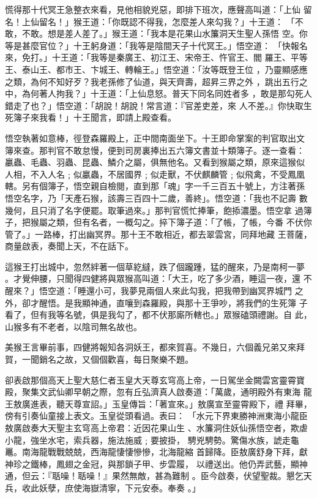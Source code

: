 \begin{pinyinscope}
{慌得那十代冥王急整衣來看，見他相貌兇惡，即排下班次，應聲高叫道：「上仙
留名！上仙留名！」猴王道：「你既認不得我，怎麼差人來勾我？」十王道：
「不敢，不敢。想是差人差了。」猴王道：「我本是花果山水簾洞天生聖人孫悟
空。你等是甚麼官位？」十王躬身道：「我等是陰間天子十代冥王。」悟空道：
「快報名來，免打。」十王道：「我等是秦廣王、初江王、宋帝王、忤官王、閻
羅王、平等王、泰山王、都市王、卞城王、轉輪王。」悟空道：「汝等既登王位
，乃靈顯感應之類，為何不知好歹？我老孫修了仙道，與天齊壽，超昇三界之外
，跳出五行之中，為何著人拘我？」十王道：「上仙息怒。普天下同名同姓者多
，敢是那勾死人錯走了也？」悟空道：「胡說！胡說！常言道：『官差吏差，來
人不差。』你快取生死簿子來我看！」十王聞言，即請上殿查看。

悟空執著如意棒，徑登森羅殿上，正中間南面坐下。十王即命掌案的判官取出文
簿來查。那判官不敢怠慢，便到司房裏捧出五六簿文書並十類簿子。逐一查看：
臝蟲、毛蟲、羽蟲、昆蟲、鱗介之屬，俱無他名。又看到猴屬之類，原來這猴似
人相，不入人名﹔似臝蟲，不居國界﹔似走獸，不伏麒麟管﹔似飛禽，不受鳳凰
轄。另有個簿子，悟空親自檢閱，直到那「魂」字一千三百五十號上，方注著孫
悟空名字，乃「天產石猴，該壽三百四十二歲，善終」。悟空道：「我也不記壽
數幾何，且只消了名字便罷。取筆過來。」那判官慌忙捧筆，飽掭濃墨。悟空拿
過簿子，把猴屬之類，但有名者，一概勾之。捽下簿子道：「了帳，了帳，今番
不伏你管了。」一路棒，打出幽冥界。那十王不敢相近，都去翠雲宮，同拜地藏
王菩薩，商量啟表，奏聞上天，不在話下。

這猴王打出城中，忽然絆著一個草紇繨，跌了個躘踵，猛的醒來，乃是南柯一夢
。才覺伸腰，只聞得四健將與眾猴高叫道：「大王，吃了多少酒，睡這一夜，還
不醒來？」悟空道：「睡還小可，我夢見兩個人來此勾我，把我帶到幽冥界城門
之外，卻才醒悟。是我顯神通，直嚷到森羅殿，與那十王爭吵，將我們的生死簿
子看了，但有我等名號，俱是我勾了，都不伏那廝所轄也。」眾猴磕頭禮謝。自
此，山猴多有不老者，以陰司無名故也。

美猴王言畢前事，四健將報知各洞妖王，都來賀喜。不幾日，六個義兄弟又來拜
賀，一聞銷名之故，又個個歡喜，每日聚樂不題。

卻表啟那個高天上聖大慈仁者玉皇大天尊玄穹高上帝，一日駕坐金闕雲宮靈霄寶
殿，聚集文武仙卿早朝之際，忽有丘弘濟真人啟奏道：「萬歲，通明殿外有東海
龍王敖廣進表，聽天尊宣詔。」玉皇傳旨：「著宣來。」敖廣宣至靈霄殿下，禮
拜畢，傍有引奏仙童接上表文。玉皇從頭看過。表曰：
「水元下界東勝神洲東海小龍臣敖廣啟奏大天聖主玄穹高上帝君：近因花果山生
、水簾洞住妖仙孫悟空者，欺虐小龍，強坐水宅，索兵器，施法施威﹔要披掛，
騁兇騁勢。驚傷水族，諕走龜鼉。南海龍戰戰兢兢，西海龍悽悽慘慘，北海龍縮
首歸降。臣敖廣舒身下拜，獻神珍之鐵棒，鳳翅之金冠，與那鎖子甲、步雲履，
以禮送出。他仍弄武藝，顯神通，但云：『聒噪！聒噪！』果然無敵，甚為難制
。臣今啟奏，伏望聖裁。懇乞天兵，收此妖孽，庶使海嶽清寧，下元安泰。奉奏
。」

}
\end{pinyinscope}
